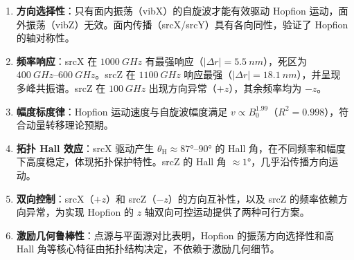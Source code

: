 \begin{enumerate}
  \item \textbf{方向选择性}：只有面内振荡（vibX）的自旋波才能有效驱动 Hopfion 运动，面外振荡（vibZ）无效。面内传播（srcX/srcY）具有各向同性，验证了 Hopfion 的轴对称性。
  \item \textbf{频率响应}：srcX 在 $\SI{1000}{GHz}$ 有最强响应（$|\Delta r| = \SI{5.5}{nm}$），死区为 $\SIrange{400}{600}{GHz}$。srcZ 在 $\SI{1100}{GHz}$ 响应最强（$|\Delta r| = \SI{18.1}{nm}$），并呈现多峰共振谱。srcZ 在 $\SI{100}{GHz}$ 出现方向异常（$+z$），其余频率均为 $-z$。
  \item \textbf{幅度标度律}：Hopfion 运动速度与自旋波幅度满足 $v \propto B_0^{1.99}$（$R^2 = 0.998$），符合动量转移理论预期。
  \item \textbf{拓扑 Hall 效应}：srcX 驱动产生 $\theta_{\text{H}} \approx \ang{87}$--$\ang{90}$ 的 Hall 角，在不同频率和幅度下高度稳定，体现拓扑保护特性。srcZ 的 Hall 角 $\approx \ang{1}$，几乎沿传播方向运动。
  \item \textbf{双向控制}：srcX（$+z$）和 srcZ（$-z$）的方向互补性，以及 srcZ 的频率依赖方向异常，为实现 Hopfion 的 $z$ 轴双向可控运动提供了两种可行方案。
  \item \textbf{激励几何鲁棒性}：点源与平面源对比表明，Hopfion 的振荡方向选择性和高 Hall 角等核心特征由拓扑结构决定，不依赖于激励几何细节。
\end{enumerate}
